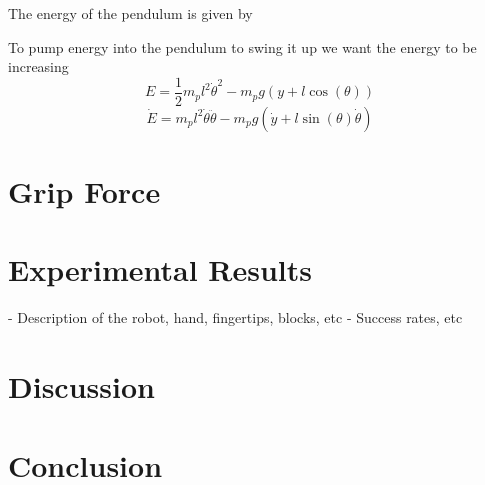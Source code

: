\documentclass{article}
\begin{document}
The energy of the pendulum is given by 

To pump energy into the pendulum to swing it up we want the energy to be increasing
\begin{equation}\label{eq:pendE}
E = \frac{1}{2}m_pl^2\dot{\theta}^2 - m_pg(y+l\cos(\theta))
\end{equation}
\begin{equation}\label{eq:pendEdot}
\dot{E} = m_pl^2\dot{\theta}\ddot{\theta} - m_pg(\dot{y}+l\sin(\theta)\dot{\theta})
\end{equation}

\section{Grip Force}

\section{Experimental Results}

- Description of the robot, hand, fingertips, blocks, etc
- Success rates, etc

\section{Discussion}

\section{Conclusion}




\end{document}

